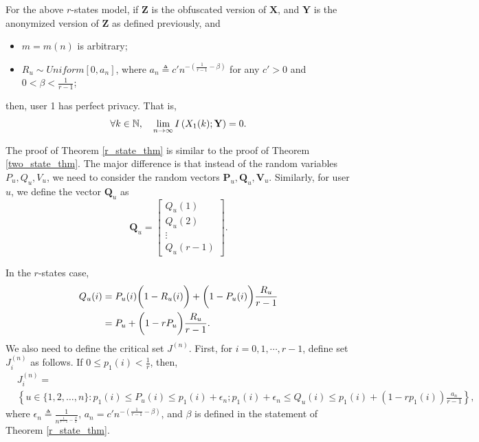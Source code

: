 %


\begin{thm}\label{r_state_thm}
For the above $r$-states model, if $\textbf{Z}$ is the obfuscated version of $\textbf{X}$, and $\textbf{Y}$ is the anonymized version of $\textbf{Z}$ as defined previously, and
\begin{itemize}
	 \item $m=m(n)$ is arbitrary;
	\item $R_u \sim Uniform [0, a_n]$, where $a_n \triangleq c'n^{-\left(\frac{1}{r-1}-\beta\right)}$ for any $c'>0$ and $0<\beta<\frac{1}{r-1}$;
\end{itemize}
then, user 1 has perfect privacy. That is,
\begin{align}%
\no  \forall k\in \mathbb{N}, \ \ \ \lim\limits_{n\rightarrow \infty} I \left(X_1(k);{\textbf{Y}}\right) =0.
\end{align}\end{thm}

The proof of Theorem \ref{r_state_thm} is similar to the proof of Theorem \ref{two_state_thm}. The major difference is that instead of the random variables $P_u, Q_u, V_u$, we need to consider the random vectors $\textbf{P}_u, \textbf{Q}_u, \textbf{V}_u$.  Similarly, for user $u$, we define the vector $\textbf{Q}_u$ as
\[\textbf{Q}_u= \begin{bmatrix}
Q_u(1) \\ Q_u(2) \\ \vdots \\Q_u(r-1) \end{bmatrix}.
\]

In the $r$-states case,
\begin{align}
\nonumber {Q}_u(i) &=P_u(i)\bigg(1-R_u(i) \bigg)+\bigg(1-P_u(i)\bigg)\frac{R_u}{r-1}  \\
\nonumber &= P_u+\bigg(1-r P_u\bigg)\frac{R_u}{r-1}.\ \
\end{align}
We also need to define the critical set $J^{(n)}$.  First, for $i=0,1, \cdots, r-1$, define set $J_i^{(n)}$ as follows. If $0\leq p_1(i)<\frac{1}{r}$, then,
\begin{align*}
&J_i^{(n)}= \\
&\left\{u \in \{1, 2, \dots, n\}: p_1(i) \leq P_u(i)\leq p_1(i)+\epsilon_n; p_1(i)+\epsilon_n\leq Q_u(i)\leq p_1(i)+(1-r p_1(i))\frac{a_n}{r-1}\right\},
\end{align*}
where $\epsilon_n \triangleq \frac{1}{n^{\frac{1}{r-1}-\frac{\beta}{2}}}$,  $a_n = c'n^{-\left(\frac{1}{r-1}-\beta\right)}$, and $\beta$ is defined in the statement of Theorem \ref{r_state_thm}.

